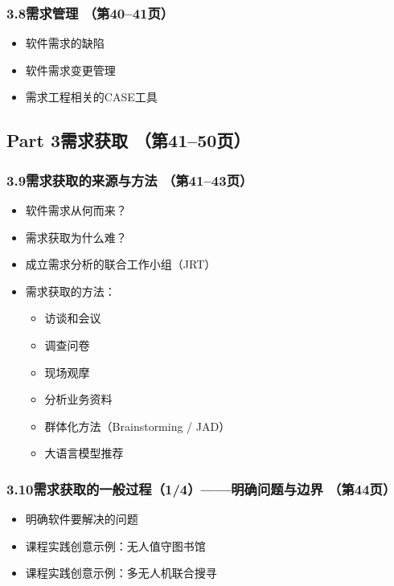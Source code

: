 \documentclass[12pt,a4paper]{ctexart}
\begin{document}
\subsubsection{3.8\quad 需求管理 \hfill（第40--41页）}
\begin{itemize}
    \item 软件需求的缺陷
    \item 软件需求变更管理
    \item 需求工程相关的CASE工具
\end{itemize}

\subsection{Part 3\quad 需求获取 \hfill（第41--50页）}

\subsubsection{3.9\quad 需求获取的来源与方法 \hfill（第41--43页）}
\begin{itemize}
    \item 软件需求从何而来？
    \item 需求获取为什么难？
    \item 成立需求分析的联合工作小组（JRT）
    \item 需求获取的方法：
    \begin{itemize}
        \item 访谈和会议
        \item 调查问卷
        \item 现场观摩
        \item 分析业务资料
        \item 群体化方法（Brainstorming / JAD）
        \item 大语言模型推荐
    \end{itemize}
\end{itemize}

\subsubsection{3.10\quad 需求获取的一般过程（1/4）——明确问题与边界 \hfill（第44页）}
\begin{itemize}
    \item 明确软件要解决的问题
    \item 课程实践创意示例：无人值守图书馆
    \item 课程实践创意示例：多无人机联合搜寻
\end{itemize}
\end{document}
